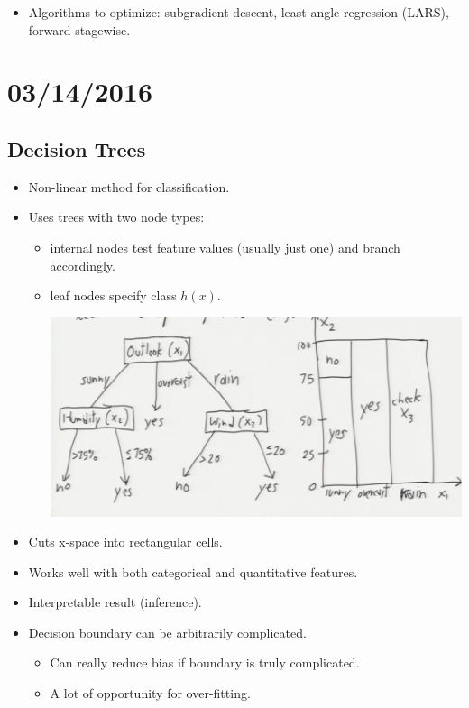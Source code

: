 \documentclass[10pt]{article}
\begin{document}
\begin{itemize}
		\item Algorithms to optimize: subgradient descent, least-angle regression (LARS), forward stagewise.
	\end{itemize}
	
\newpage
\section*{03/14/2016}
\subsection*{Decision Trees}
	\begin{itemize}
		\item Non-linear method for classification.
		\item Uses trees with two node types:
			\begin{itemize}
				\item internal nodes test feature values (usually just one) and branch accordingly.
				\item leaf nodes specify class $h(x)$.	
				\begin{center}
					\includegraphics[scale=0.6]{images/tree:graph}
				\end{center}
			\end{itemize}
		\item Cuts x-space into rectangular cells.
		\item Works well with both categorical and quantitative features.
		\item Interpretable result (inference).
		\item Decision boundary can be arbitrarily complicated.
			\begin{itemize}
				\item Can really reduce bias if boundary is truly complicated.
				\item A lot of opportunity for over-fitting.
				\begin{center}

\end{center}
\end{itemize}
\end{itemize}
\end{document}
